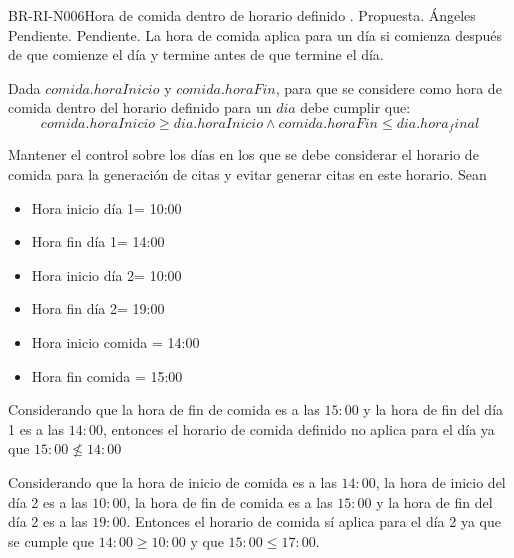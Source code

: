 \begin{BusinessRule}{BR-RI-N006}{Hora de comida dentro de horario definido}
	{\bcCondition}%
	{\btEnabler  }   %
	{\blControlling}   %
	.
	\BRItem[Estado] Propuesta.
	 Ángeles
	 Pendiente.
	 Pendiente.
	\BRItem[Descripción] La hora de comida aplica para un día si comienza después de que comienze el día y termine antes de que termine el día.
	
	\BRItem[Sentencia] \cdtEmpty
	Dada  $comida.horaInicio$ y  $comida.horaFin$, para que se considere como hora de comida dentro del horario definido para un $dia$ debe cumplir que:
	$$comida.horaInicio \ge dia.horaInicio \land comida.horaFin \le dia.hora_final$$
	
	\BRItem[Motivación] Mantener el control sobre los días en los que se debe considerar el horario de comida para la generación de citas y evitar generar citas en este horario.
	\BRItem[Ejemplo]
	Sean 
	\begin{itemize}
		\item Hora inicio día 1= 10:00
		\item Hora fin día 1= 14:00
		\item Hora inicio día 2= 10:00
		\item Hora fin día 2= 19:00
		\item Hora inicio comida = 14:00
		\item Hora fin comida = 15:00
	\end{itemize}
	Considerando que la hora de fin de comida es a las $15:00$ y la hora de fin del día 1 es a las $14:00$, entonces el horario de comida definido no aplica para el día ya que $15:00 \not \le 14:00$
	
	Considerando que la hora de inicio de comida es a las $14:00$, la hora de inicio del día 2 es a las $10:00$, la hora de fin de comida es a las $15:00$ y la hora de fin del día 2 es a las $19:00$. Entonces el horario de comida sí aplica para el día 2 ya que se cumple que $14:00 \ge 10:00$ y que $15:00 \le 17:00$.
	
\end{BusinessRule}


